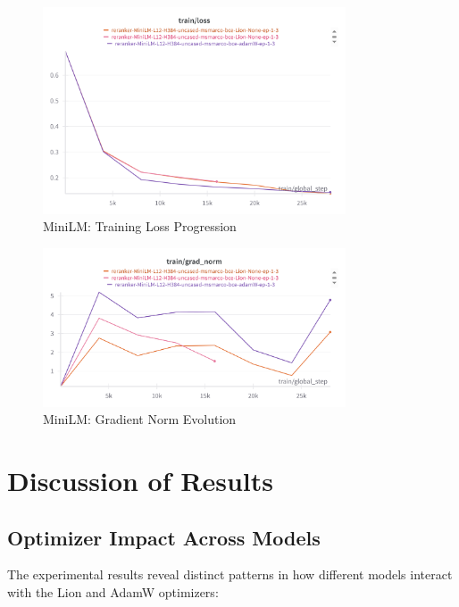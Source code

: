 \begin{figure}[htbp]
    \centering
    \includegraphics[width=0.8\textwidth]{Figures/microsoft_MiniLM-L12-H384-uncased_adamW_v_Lion_train_loss.png}
    \caption{MiniLM: Training Loss Progression}
    \label{fig:minilm_train_loss}
\end{figure}

\begin{figure}[htbp]
    \centering
    \includegraphics[width=0.8\textwidth]{Figures/microsoft_MiniLM-L12-H384-uncased_adamW_v_Lion_grad_norm.png}
    \caption{MiniLM: Gradient Norm Evolution}
    \label{fig:minilm_grad_norm}
\end{figure}

\section{Discussion of Results}

\subsection{Optimizer Impact Across Models}

The experimental results reveal distinct patterns in how different models interact with the Lion and AdamW optimizers:

